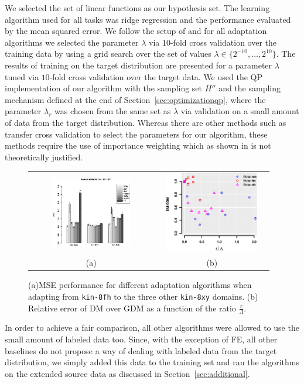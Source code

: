 \documentclass[twoside,11pt]{article}
\newcommand{\1}{\mat{1}}
\begin{document}
We selected the set of linear functions as our hypothesis set. The
learning algorithm used for all tasks was ridge regression and the
performance evaluated by the mean squared error. We follow the setup
of \cite{CortesMohri2011} and for all adaptation algorithms we
selected the parameter $\lambda$ via 10-fold cross validation over the
training data by using a grid search over the set of values
$\lambda \in \{2^{-10}, \ldots, 2^{10} \}$. The results of training on the
target distribution are presented for a parameter $\lambda$ tuned via
$10$-fold cross validation over the target data. We used the QP
implementation of our algorithm with the sampling set $H''$ and the
sampling mechanism defined at the end of
Section~\ref{sec:optimizationqp}, where the parameter $\lambda_r$ was
chosen from the same set as $\lambda$ via validation on a small
amount of data from the target distribution. Whereas there are other
methods such as transfer cross validation \citep{Zhong} to select the
parameters for our algorithm, these methods require the use of
importance weighting which as shown in \citep{importance} is not
theoretically justified.

\begin{figure}[t]
\centering
\begin{tabular}{cc}
\includegraphics[width=2.1in, height=1.2in]{kin-crop.pdf}
&
\includegraphics[width=1.9in, height=1.4in]{qtor.pdf} \\
(a) & (b)
\end{tabular}
\caption{(a)MSE performance for different adaptation algorithms when
  adapting from {\tt kin-8fh} to the three other {\tt kin-8xy}
  domains. (b) Relative error of DM over GDM as a function of the
  ratio $\frac{r}{\Lambda}$.}
\label{fig:kin}
\end{figure}

In order to achieve a fair comparison, all other algorithms were
allowed to use the small amount of labeled data too. Since, with the
exception of FE, all other baselines do not propose a way of dealing
with labeled data from the target distribution, we simply added this
data to the training set and ran the algorithms on the extended source
data as discussed in Section~\ref{sec:additional}.
\end{document}

